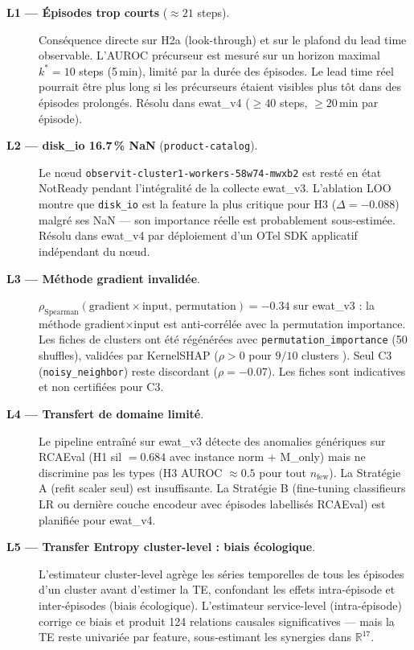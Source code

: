 \begin{description}
  \item[\textbf{L1 --- Épisodes trop courts} ($\approx 21$ steps).]
    Conséquence directe sur H2a (look-through) et sur le plafond du lead time observable.
    L'AUROC précurseur est mesuré sur un horizon maximal $k^* = 10$ steps (5\,min),
    limité par la durée des épisodes. Le lead time réel pourrait être plus long si les
    précurseurs étaient visibles plus tôt dans des épisodes prolongés.
    Résolu dans ewat\_v4 ($\geq 40$ steps, $\geq 20$\,min par épisode).

  \item[\textbf{L2 --- disk\_io 16.7\,\% NaN} (\texttt{product-catalog}).]
    Le nœud \texttt{observit-cluster1-workers-58w74-mwxb2} est resté en état NotReady
    pendant l'intégralité de la collecte ewat\_v3. L'ablation LOO montre que
    \texttt{disk\_io} est la feature la plus critique pour H3 ($\Delta = -0.088$)
    malgré ses NaN --- son importance réelle est probablement sous-estimée.
    Résolu dans ewat\_v4 par déploiement d'un OTel SDK applicatif indépendant du nœud.

  \item[\textbf{L3 --- Méthode gradient invalidée}.]
    $\rho_\text{Spearman}(\text{gradient} \times \text{input},\, \text{permutation}) = -0.34$
    sur ewat\_v3 : la méthode gradient×input est anti-corrélée avec la permutation importance.
    Les fiches de clusters ont été régénérées avec \texttt{permutation\_importance}
    (50 shuffles), validées par KernelSHAP ($\rho > 0$ pour $9/10$ clusters
    \cite{lundberg2017}). Seul C3 (\texttt{noisy\_neighbor}) reste discordant ($\rho = -0.07$).
    Les fiches sont indicatives et non certifiées pour C3.

  \item[\textbf{L4 --- Transfert de domaine limité}.]
    Le pipeline entraîné sur ewat\_v3 détecte des anomalies génériques sur RCAEval
    (H1 sil $= 0.684$ avec instance norm + M\_only) mais ne discrimine pas les types
    (H3 AUROC $\approx 0.5$ pour tout $n_\text{few}$).
    La Stratégie A (refit scaler seul) est insuffisante.
    La Stratégie B (fine-tuning classifieurs LR ou dernière couche encodeur avec épisodes
    labellisés RCAEval) est planifiée pour ewat\_v4.

  \item[\textbf{L5 --- Transfer Entropy cluster-level : biais écologique}.]
    L'estimateur cluster-level agrège les séries temporelles de tous les épisodes d'un
    cluster avant d'estimer la TE, confondant les effets intra-épisode et inter-épisodes
    (biais écologique). L'estimateur service-level (intra-épisode) corrige ce biais
    et produit 124 relations causales significatives --- mais la TE reste univariée par
    feature, sous-estimant les synergies dans $\mathbb{R}^{17}$.


\end{description}
